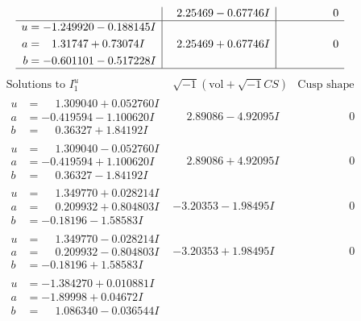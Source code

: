 \documentclass[1p]{elsarticle_modified}
\theoremstyle{definition}
\newcommand{\I}{\sqrt{-1}}
\begin{document}
$$\begin{array}{c|c|c}
 & \phantom{-}2.25469 - 0.67746 I & \phantom{-0.000000 } 0 \\ \hline\begin{aligned}
u &= -1.249920 - 0.188145 I \\
a &= \phantom{-}1.31747 + 0.73074 I \\
b &= -0.601101 - 0.517228 I\end{aligned}
 & \phantom{-}2.25469 + 0.67746 I & \phantom{-0.000000 } 0\\
 \hline 
 \end{array}$$\newpage$$\begin{array}{c|c|c}  
\text{Solutions to }I^u_{1}& \I (\text{vol} + \sqrt{-1}CS) & \text{Cusp shape}\\
 \hline 
\begin{aligned}
u &= \phantom{-}1.309040 + 0.052760 I \\
a &= -0.419594 - 1.100620 I \\
b &= \phantom{-}0.36327 + 1.84192 I\end{aligned}
 & \phantom{-}2.89086 - 4.92095 I & \phantom{-0.000000 } 0 \\ \hline\begin{aligned}
u &= \phantom{-}1.309040 - 0.052760 I \\
a &= -0.419594 + 1.100620 I \\
b &= \phantom{-}0.36327 - 1.84192 I\end{aligned}
 & \phantom{-}2.89086 + 4.92095 I & \phantom{-0.000000 } 0 \\ \hline\begin{aligned}
u &= \phantom{-}1.349770 + 0.028214 I \\
a &= \phantom{-}0.209932 + 0.804803 I \\
b &= -0.18196 - 1.58583 I\end{aligned}
 & -3.20353 - 1.98495 I & \phantom{-0.000000 } 0 \\ \hline\begin{aligned}
u &= \phantom{-}1.349770 - 0.028214 I \\
a &= \phantom{-}0.209932 - 0.804803 I \\
b &= -0.18196 + 1.58583 I\end{aligned}
 & -3.20353 + 1.98495 I & \phantom{-0.000000 } 0 \\ \hline\begin{aligned}
u &= -1.384270 + 0.010881 I \\
a &= -1.89998 + 0.04672 I \\
b &= \phantom{-}1.086340 - 0.036544 I\end{aligned}

\end{array}$$
\end{document}
